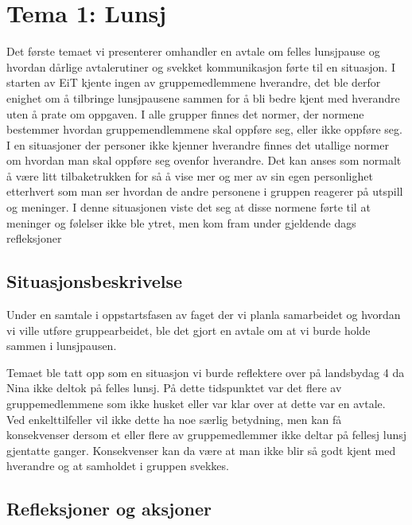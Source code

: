 \chapter{Tema 1: Lunsj}


Det første temaet vi presenterer omhandler en avtale om felles lunsjpause og hvordan dårlige avtalerutiner og svekket kommunikasjon førte til en situasjon. I starten av EiT kjente ingen av gruppemedlemmene hverandre, det ble derfor enighet om å tilbringe lunsjpausene sammen for å bli bedre kjent med hverandre uten å prate om oppgaven. I alle grupper finnes det normer, der normene bestemmer hvordan gruppemendlemmene skal oppføre seg, eller ikke oppføre seg. \cite{Artikkel2} I en situasjoner der personer ikke kjenner hverandre finnes det utallige normer om hvordan man skal oppføre seg ovenfor hverandre. Det kan anses som normalt å være litt tilbaketrukken for så å vise mer og mer av sin egen personlighet etterhvert som man ser hvordan de andre personene i gruppen reagerer på utspill og meninger. I denne situasjonen viste det seg at disse normene førte til at meninger og følelser ikke ble ytret, men kom fram under gjeldende dags refleksjoner

\section{Situasjonsbeskrivelse}

Under en samtale i oppstartsfasen av faget der vi planla samarbeidet og hvordan vi ville utføre gruppearbeidet, ble det gjort en avtale om at vi burde holde sammen i lunsjpausen.


Temaet ble tatt opp som en situasjon vi burde reflektere over på landsbydag 4 da Nina ikke deltok på felles lunsj. På dette tidspunktet var det flere av gruppemedlemmene som ikke husket eller var klar over at dette var en avtale. Ved enkelttilfeller vil ikke dette ha noe særlig betydning, men kan få konsekvenser dersom et eller flere av gruppemedlemmer ikke deltar på fellesj lunsj gjentatte ganger. Konsekvenser kan da være at man ikke blir så godt kjent med hverandre og at samholdet i gruppen svekkes. 

\section{Refleksjoner og aksjoner}

